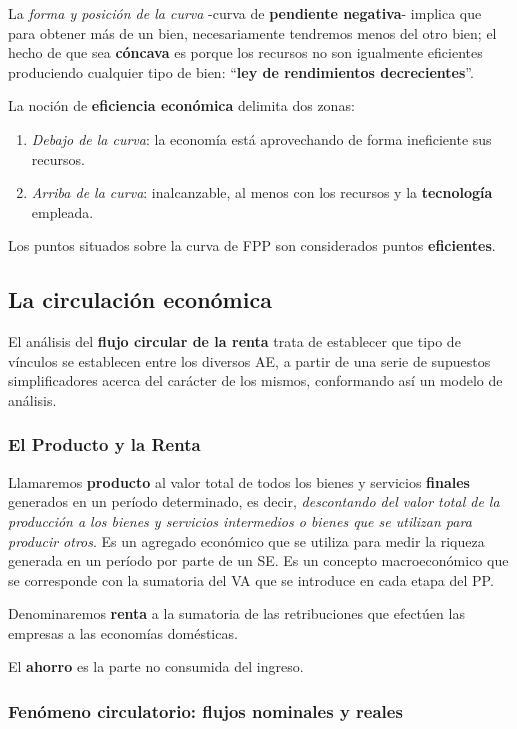 \documentclass[10pt,a4paper]{article}
\begin{document}
La \textit{forma y posición de la curva} -curva de \textbf{pendiente negativa}- implica que para obtener más de un bien, necesariamente tendremos menos del otro bien; el hecho de que sea \textbf{cóncava} es porque los recursos no son igualmente eficientes produciendo cualquier tipo de bien: ``\textbf{ley de rendimientos decrecientes}''.

La noción de \textbf{eficiencia económica} delimita dos zonas:
\begin{enumerate}
\item \textit{Debajo de la curva}: la economía está aprovechando de forma ineficiente sus recursos.
\item \textit{Arriba de la curva}: inalcanzable, al menos con los recursos y la \textbf{tecnología} empleada.
\end{enumerate}

Los puntos situados sobre la curva de FPP son considerados puntos \textbf{eficientes}.

\subsection{La circulación económica}

El análisis del \textbf{flujo circular de la renta} trata de establecer que tipo de vínculos se establecen entre los diversos AE, a partir de una serie de supuestos simplificadores acerca del carácter de los mismos, conformando así un modelo de análisis.

\subsubsection{El Producto y la Renta}

Llamaremos \textbf{producto} al valor total de todos los bienes y servicios \textbf{finales} generados en un período determinado, es decir, \textit{descontando del valor total de la producción a los bienes y servicios intermedios o bienes que se utilizan para producir otros}. Es un agregado económico que se utiliza para medir la riqueza generada en un período por parte de un SE. Es un concepto macroeconómico que se corresponde con la sumatoria del VA que se introduce en cada etapa del PP.

Denominaremos \textbf{renta} a la sumatoria de las retribuciones que efectúen las empresas a las economías domésticas.

El \textbf{ahorro} es la parte no consumida del ingreso.

\subsubsection{Fenómeno circulatorio: flujos nominales y reales}
\end{document}
